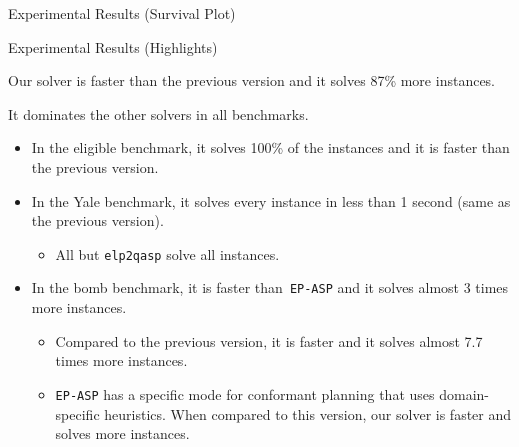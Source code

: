 \documentclass[aspectratio=169,svgnames,xcolor=table,t]{beamer}
\begin{document}
\begin{frame}{Experimental Results (Survival Plot)}
    
\end{frame}
\begin{frame}{Experimental Results (Highlights)}
    \begin{myitemize}
        \item Our solver is  faster than the previous version and it solves 87\% more instances.
        \item It dominates the other solvers in all benchmarks.
        \begin{itemize}
            \item In the eligible benchmark, it solves 100\% of the instances and it is  faster than the previous version.
            
            \item In the Yale benchmark, it solves every instance in less than 1 second (same as the previous version).
            \begin{itemize}
                \item All but \texttt{elp2qasp} solve all instances.
            \end{itemize}
            
            \item In the bomb benchmark, it is  faster than~\texttt{EP-ASP} and it solves almost 3 times more instances.
            \begin{itemize}
                \item Compared to the previous version, it is  faster and it solves almost 7.7 times more instances.
                \item \texttt{EP-ASP} has a specific mode for conformant planning that uses domain-specific heuristics. When compared to this version, our solver is  faster and solves  more instances.
            \end{itemize}
        \end{itemize}
    \end{myitemize}
\end{frame}
\end{document}
